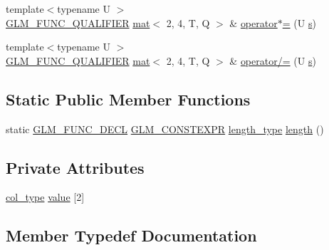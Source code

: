 \begin{DoxyCompactItemize}
\item 
{\footnotesize template$<$typename U $>$ }\\\mbox{\hyperlink{setup_8hpp_a33fdea6f91c5f834105f7415e2a64407}{G\+L\+M\+\_\+\+F\+U\+N\+C\+\_\+\+Q\+U\+A\+L\+I\+F\+I\+ER}} \mbox{\hyperlink{structglm_1_1mat}{mat}}$<$ 2, 4, T, Q $>$ \& \mbox{\hyperlink{structglm_1_1mat_3_012_00_014_00_01_t_00_01_q_01_4_ac24896ac1bbba0ec89256b63209e4593}{operator$\ast$=}} (U \mbox{\hyperlink{_s_d_l__opengl_8h_a4af680a6c683f88ed67b76f207f2e6e4}{s}})
\item 
{\footnotesize template$<$typename U $>$ }\\\mbox{\hyperlink{setup_8hpp_a33fdea6f91c5f834105f7415e2a64407}{G\+L\+M\+\_\+\+F\+U\+N\+C\+\_\+\+Q\+U\+A\+L\+I\+F\+I\+ER}} \mbox{\hyperlink{structglm_1_1mat}{mat}}$<$ 2, 4, T, Q $>$ \& \mbox{\hyperlink{structglm_1_1mat_3_012_00_014_00_01_t_00_01_q_01_4_af8635abf4f1d5f627b0d346d2c850911}{operator/=}} (U \mbox{\hyperlink{_s_d_l__opengl_8h_a4af680a6c683f88ed67b76f207f2e6e4}{s}})
\end{DoxyCompactItemize}
\subsection*{Static Public Member Functions}
\begin{DoxyCompactItemize}
\item 
static \mbox{\hyperlink{setup_8hpp_ab2d052de21a70539923e9bcbf6e83a51}{G\+L\+M\+\_\+\+F\+U\+N\+C\+\_\+\+D\+E\+CL}} \mbox{\hyperlink{setup_8hpp_a08b807947b47031d3a511f03f89645ad}{G\+L\+M\+\_\+\+C\+O\+N\+S\+T\+E\+X\+PR}} \mbox{\hyperlink{structglm_1_1mat_3_012_00_014_00_01_t_00_01_q_01_4_a5295c484627e965d615f3367c2ca45d8}{length\+\_\+type}} \mbox{\hyperlink{structglm_1_1mat_3_012_00_014_00_01_t_00_01_q_01_4_a52f7dc5b855a6dab6b479a3bcf29357b}{length}} ()
\end{DoxyCompactItemize}
\subsection*{Private Attributes}
\begin{DoxyCompactItemize}
\item 
\mbox{\hyperlink{structglm_1_1mat_3_012_00_014_00_01_t_00_01_q_01_4_ae14ad10a9d8ce3908ec89ae373a27872}{col\+\_\+type}} \mbox{\hyperlink{structglm_1_1mat_3_012_00_014_00_01_t_00_01_q_01_4_af1b1c45fac74697c901db6f2909b24f3}{value}} \mbox{[}2\mbox{]}
\end{DoxyCompactItemize}


\subsection{Member Typedef Documentation}
\mbox{\label{structglm_1_1mat_3_012_00_014_00_01_t_00_01_q_01_4_ae14ad10a9d8ce3908ec89ae373a27872}} 
